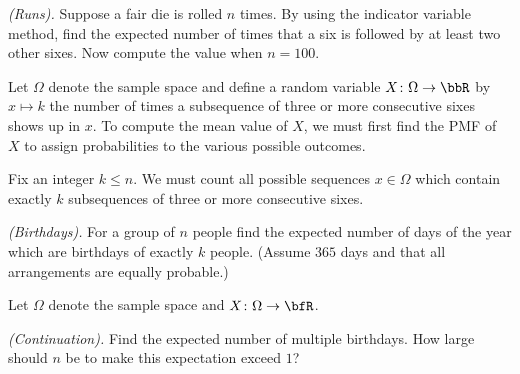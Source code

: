\begin{problem}[Handout 6, \# 9]
  \emph{(Runs).} Suppose a fair die is rolled \(n\) times. By using the
  indicator variable method, find the expected number of times that a six
  is followed by at least two other sixes. Now compute the value when
  \(n=100\).
\end{problem}
\begin{solution}
  Let \(\Omega\) denote the sample space and define a random variable
  \(X\colon\Omega\to\bbR\) by \(x\mapsto k\) the number of times a
  subsequence of three or more consecutive sixes shows up in \(x\). To
  compute the mean value of \(X\), we must first find the PMF of \(X\) to
  assign probabilities to the various possible outcomes.

  Fix an integer \(k\leq n\). We must count all possible sequences
  \(x\in\Omega\) which contain exactly \(k\) subsequences of three or more
  consecutive sixes.
\end{solution}
\newpage

\begin{problem}[Handout 6, \# 10]
  \emph{(Birthdays).} For a group of \(n\) people find the expected number
  of days of the year which are birthdays of exactly \(k\) people. (Assume
  \(365\) days and that all arrangements are equally probable.)
\end{problem}
\begin{solution}
  Let \(\Omega\) denote the sample space and \(X\colon\Omega\to\bfR\).
\end{solution}
\newpage

\begin{problem}[Handout 6, \# 11]
  \emph{(Continuation).} Find the expected number of multiple
  birthdays. How large should \(n\) be to make this expectation exceed
  \(1\)?
\end{problem}
\begin{solution}

\end{solution}
\newpage

